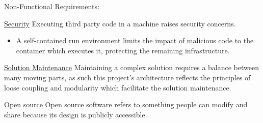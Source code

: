 \begin{flushleft}
Non-Functional Requirements:
\end{flushleft}

\begin{description}[font=$\bullet$~\normalfont\scshape\color{red!50!black}]
         
\item \underline{Security} Executing third party code in a machine raises security concerns.
	\begin{itemize}
		\item 
		\iffalse		
		Executing the services which will execute this code in containers adresses some of these concerns.
		\fi 
		A self-contained run environment limits the impact of malicious code to the container which executes it, protecting the remaining infrastructure.
	\end{itemize}	   
              
\item \underline{Solution Maintenance}     
        Maintaining a complex solution requires a balance between many moving parts, as such this project's architecture reflects the principles of loose coupling and modularity which facilitate the solution maintenance.      

\iffalse
\item \underline{Efficiency}    
        Hosting the solution in a cloud based environment improves efficiency of the solution. 
\fi
\item \underline{Open source}     
        Open source software refers to something people can modify and share because its design is publicly accessible.

\end{description}